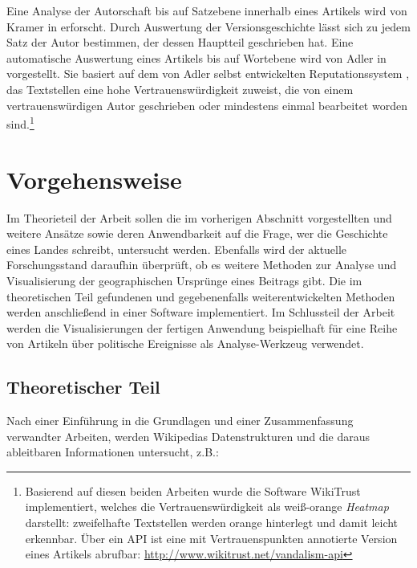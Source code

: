 Eine Analyse der Autorschaft bis auf Satzebene innerhalb eines Artikels wird von Kramer in \cite{kramer2008wiki} erforscht.
Durch Auswertung der Versionsgeschichte lässt sich zu jedem Satz der Autor bestimmen, der dessen Hauptteil geschrieben hat.
Eine automatische Auswertung eines Artikels bis auf Wortebene wird von Adler in \cite{adler2008assigning} vorgestellt.
Sie basiert auf dem von Adler selbst entwickelten Reputationssystem \cite{adler2007content}, das Textstellen eine hohe Vertrauenswürdigkeit zuweist, die von einem vertrauenswürdigen Autor geschrieben oder mindestens einmal bearbeitet worden sind.\footnote{Basierend auf diesen beiden Arbeiten wurde die Software WikiTrust implementiert, welches die Vertrauenswürdigkeit als weiß-orange \emph{Heatmap} darstellt: zweifelhafte Textstellen werden orange hinterlegt und damit leicht erkennbar. Über ein API ist eine mit Vertrauenspunkten annotierte Version eines Artikels abrufbar: \url{http://www.wikitrust.net/vandalism-api}\label{wikitrust}}


\section{Vorgehensweise}

Im Theorieteil der Arbeit sollen die im vorherigen Abschnitt vorgestellten und weitere Ansätze sowie deren Anwendbarkeit auf die Frage, wer die Geschichte eines Landes schreibt, untersucht werden.
Ebenfalls wird der aktuelle Forschungsstand daraufhin überprüft, ob es weitere Methoden zur Analyse und Visualisierung der geographischen Ursprünge eines Beitrags gibt.
Die im theoretischen Teil gefundenen und gegebenenfalls weiterentwickelten Methoden werden anschließend in einer Software implementiert.
Im Schlussteil der Arbeit werden die Visualisierungen der fertigen Anwendung beispielhaft für eine Reihe von Artikeln über politische Ereignisse als Analyse-Werkzeug verwendet.

\subsection{Theoretischer Teil}

Nach einer Einführung in die Grundlagen und einer Zusammenfassung verwandter Arbeiten, werden Wikipedias Datenstrukturen und die daraus ableitbaren Informationen untersucht, z.B.:

